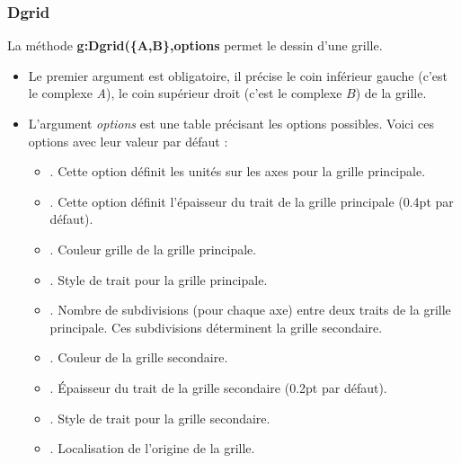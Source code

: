 \subsubsection{Dgrid}

La méthode \textbf{g:Dgrid(\{A,B\},options} permet le dessin d'une grille.
\begin{itemize}
    \item Le premier argument est obligatoire, il précise le coin inférieur gauche (c'est le complexe \emph{A}), le coin supérieur droit (c'est le complexe $B$) de la grille.
    \item L'argument \emph{options} est une table précisant les options possibles. Voici ces options avec leur valeur par défaut :
        \begin{itemize}
            \item {}. Cette option définit les unités sur les axes pour la grille principale.
            \item {}. Cette option définit l'épaisseur du trait de la grille principale (0.4pt par défaut).
            \item {}. Couleur grille de la grille principale.
            \item {}. Style de trait pour la grille principale.
            \item {}. Nombre de subdivisions (pour chaque axe) entre deux traits de la grille principale. Ces subdivisions déterminent la grille secondaire.
            \item {}. Couleur de la grille secondaire.
            \item {}. Épaisseur du trait de la grille secondaire (0.2pt par défaut).
            \item {}. Style de trait pour la grille secondaire.
            \item {}. Localisation de l'origine de la grille.
        \end{itemize}
\end{itemize}

